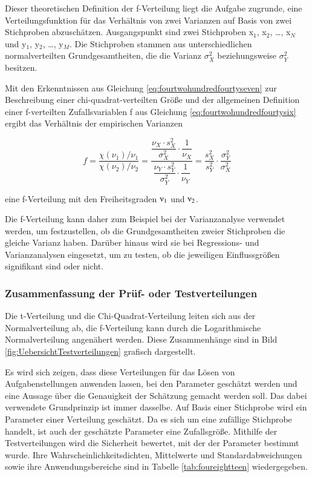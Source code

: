 \noindent Dieser theoretischen Definition der f-Verteilung liegt die Aufgabe zugrunde, eine Verteilungsfunktion f\"{u}r das Verh\"{a}ltnis von zwei Varianzen auf Basis von zwei Stichproben abzusch\"{a}tzen. Ausgangspunkt sind zwei Stichproben x$_{1}$, x$_{2}$, {\dots}, x$_{N}$ und y$_{1}$, y$_{2}$, {\dots}, y${}_{M}$. Die Stichproben stammen aus unterschiedlichen normalverteilten Grundgesamtheiten, die die Varianz $\sigma_{X}^{2}$ beziehungsweise $\sigma_{Y}^{2}$ besitzen. 

\noindent Mit den Erkenntnissen aus Gleichung \eqref{eq:fourtwohundredfourtyseven} zur Beschreibung einer chi-quadrat-verteilten Gr\"{o}{\ss}e und der allgemeinen Definition einer f-verteilten Zufallsvariablen f aus Gleichung \eqref{eq:fourtwohundredfourtysix} ergibt das Verh\"{a}ltnis der empirischen Varianzen

\begin{equation}\label{eq:fourtwohundredfifty}
f=\dfrac{\chi \left(\nu _{1} \right)/\nu _{1} }{\chi \left(\nu _{2} \right)/\nu _{2} } =\dfrac{\dfrac{\nu _{X} \cdot s_{X}^{2} }{\sigma _{X}^{2} } \cdot \dfrac{1}{\nu _{X} } }{\dfrac{\nu _{Y} \cdot s_{Y}^{2} }{\sigma _{Y}^{2} } \cdot \dfrac{1}{\nu _{Y} } } =\dfrac{s_{X}^{2} }{s_{Y}^{2} } \cdot \dfrac{\sigma _{Y}^{2} }{\sigma _{X}^{2} }
\end{equation}

\noindent eine f-Verteilung mit den Freiheitsgraden $\nuup_{1}$ und $\nuup_{2}$.\newline

\noindent Die f-Verteilung kann daher zum Beispiel bei der Varianzanalyse verwendet werden, um festzustellen, ob die Grundgesamtheiten zweier Stichproben die gleiche Varianz haben. Dar\"{u}ber hinaus wird sie bei Regressions- und Varianzanalysen eingesetzt, um zu testen, ob die jeweiligen Einflussgr\"{o}{\ss}en signifikant sind oder nicht. 


\subsubsection{Zusammenfassung der Pr\"{u}f- oder Testverteilungen}

\noindent Die t-Verteilung und die Chi-Quadrat-Verteilung leiten sich aus der Normalverteilung ab, die f-Verteilung kann durch die Logarithmische Normalverteilung angen\"{a}hert werden. Diese Zusammenh\"{a}nge sind in Bild \ref{fig:UebersichtTestverteilungen} grafisch dargestellt.\newline

\noindent Es wird sich zeigen, dass diese Verteilungen f\"{u}r das L\"{o}sen von Aufgabenstellungen anwenden lassen, bei den Parameter gesch\"{a}tzt werden und eine Aussage \"{u}ber die Genauigkeit der Sch\"{a}tzung gemacht werden soll. Das dabei verwendete Grundprinzip ist immer dasselbe. Auf Basis einer Stichprobe wird ein Parameter einer Verteilung gesch\"{a}tzt. Da es sich um eine zuf\"{a}llige Stichprobe handelt, ist auch der gesch\"{a}tzte Parameter eine Zufallsgr\"{o}{\ss}e. Mithilfe der Testverteilungen wird die Sicherheit bewertet, mit der der Parameter bestimmt wurde. Ihre Wahrscheinlichkeitsdichten, Mittelwerte und Standardabweichungen sowie ihre Anwendungsbereiche sind in Tabelle \ref{tab:foureightteen} wiedergegeben.

